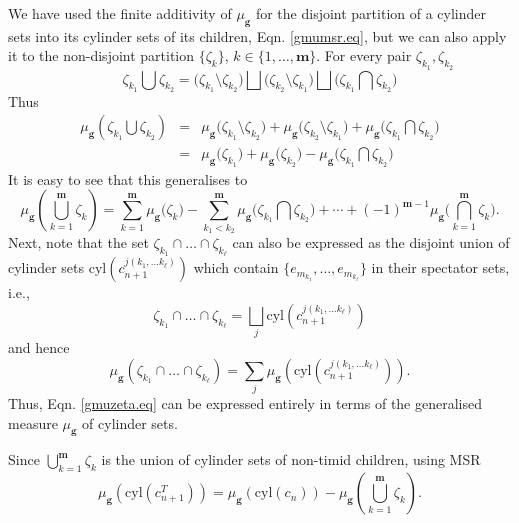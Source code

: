 \documentclass[11pt]{article}
\newcommand{\cyl}[1]{{\mathrm{cyl}({#1})}}
\newcommand{\gmu}{\mu_{\mathbf{g}}}
\newcommand{\bmm}{{\mathbf m}}
\begin{document}
We have used the finite additivity of $\gmu$ for the disjoint
partition of a cylinder sets into its cylinder sets of its children,
Eqn. \eqref{gmumsr.eq}, but we can also
apply it to the non-disjoint partition $\{ \zeta_k \}$, $k  \in \{ 
1, \ldots, \bmm \}$. For every pair $\zeta_{k_1}, \zeta_{k_2}$
\begin{equation}
  \zeta_{k_1} \bigcup  \zeta_{k_2} =  \bigl(\zeta_{k_1} \setminus
  \zeta_{k_2} \bigr)
\bigsqcup \bigl(\zeta_{k_2} \setminus \zeta_{k_1} \bigr) \bigsqcup \bigl(\zeta_{k_1}
\bigcap \zeta_{k_2}\bigr)
\end{equation} 
Thus
\begin{eqnarray} 
\gmu( \zeta_{k_1} \bigcup  \zeta_{k_2}) & = &  \gmu\bigl(\zeta_{k_1} \setminus
  \zeta_{k_2} \bigr) + \gmu\bigl(\zeta_{k_2} \setminus \zeta_{k_1}
  \bigr) + \gmu\bigl(\zeta_{k_1}
                                              \bigcap \zeta_{k_2}\bigr)  \nonumber \\
  &=&  \gmu\bigl(\zeta_{k_1}\bigr)+
\gmu\bigl(\zeta_{k_2}\bigr) -\gmu\bigl(\zeta_{k_1} 
\bigcap \zeta_{k_2}\bigr)
\end{eqnarray} 
It is easy to see that this generalises to
\begin{equation}
\gmu( \bigcup_{k=1}^{\bmm} \zeta_k) = \sum_{k=1}^{\bmm}
\gmu\bigl (\zeta_k\bigr) - \sum_{k_1<k_2}^{\bmm}\gmu\bigl(\zeta_{k_1}  \bigcap
\zeta_{k_2}  \bigr) + \cdots + (-1)^{\bmm-1}
\gmu\bigl(\bigcap_{k=1}^{\bmm} \zeta_k\bigr) \label{gmuzeta.eq}.
\end{equation}
Next, note that the set $\zeta_{k_1} \cap \ldots \cap \zeta_{k_\ell}$ can
also be expressed as 
the disjoint union of  cylinder sets $\cyl{c_{n+1}^{j(k_1, \ldots k_\ell)}}$
which contain  $\{ e_{m_{k_1}}, \ldots,  e_{m_{k_\ell}}\}$ in their spectator
sets, i.e.,
\begin{equation}
\zeta_{k_1} \cap \ldots \cap \zeta_{k_\ell}=\bigsqcup_j
\cyl{c_{n+1}^{j(k_1, \ldots k_\ell)}}
  \end{equation} 
  and hence
  \begin{equation}
    \gmu(\zeta_{k_1} \cap \ldots \cap \zeta_{k_\ell})=\sum_j 
\gmu(\cyl{c_{n+1}^{j(k_1, \ldots k_\ell)}}). \label{gmuintzeta.eq} 
\end{equation}
Thus, Eqn. \eqref{gmuzeta.eq} can be expressed entirely in terms of the
generalised measure $\gmu$ of cylinder sets. 

Since  $\bigcup_{k=1}^{\bmm} \zeta_k$ is the union of cylinder
sets of  non-timid children, using MSR 
\begin{equation}
\gmu(\cyl{c_{n+1}^T})= \gmu(\cyl{c_{n}}) -\gmu(
\bigcup_{k=1}^{\bmm} \zeta_k) .  \label{gmutimid.eq} 
\end{equation}
\end{document}
